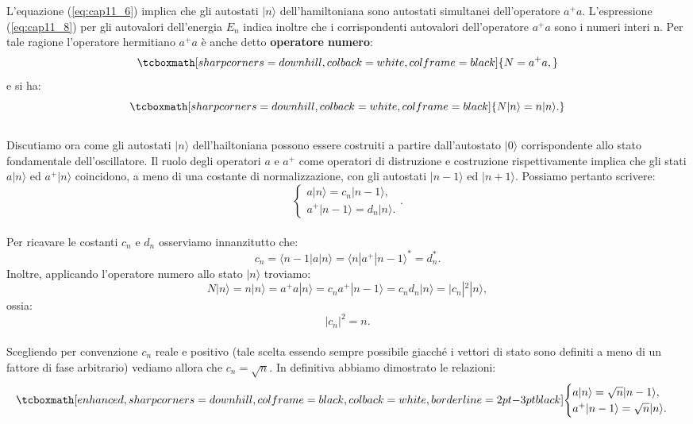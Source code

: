 \documentclass[a4paper,12pt,oneside]{book}
\begin{document}
 L'equazione (\ref{eq:cap11_6}) implica che gli autostati $|n\rangle$ dell'hamiltoniana sono autostati simultanei dell'operatore $a^+a$. L'espressione (\ref{eq:cap11_8}) per gli autovalori dell'energia $E_n$ indica inoltre che i corrispondenti autovalori dell'operatore $a^+a$ sono i numeri interi n. Per tale ragione l'operatore hermitiano $a^+a$ è anche detto \textbf{operatore numero}:
	\begin{equation}
		\tcboxmath[sharp corners=downhill, colback=white, colframe=black]{
			N=a^+a,
			}
	\end{equation}
e si ha:
	\begin{equation}
		\tcboxmath[sharp corners=downhill, colback=white, colframe=black]{
			N|n\rangle=n|n\rangle .
			}
	\end{equation}\\
	
 Discutiamo ora come gli autostati $|n\rangle$ dell'hailtoniana possono essere costruiti a partire dall'autostato $|0\rangle$ corrispondente allo stato fondamentale dell'oscillatore.  Il ruolo degli operatori $a$ e $a^+$ come operatori di distruzione e costruzione rispettivamente implica che gli stati $a|n\rangle$ ed $a^+|n\rangle$ coincidono, a meno di una costante di normalizzazione, con gli autostati $|n-1\rangle$ ed $|n+1\rangle$. Possiamo pertanto scrivere:
	\begin{equation}
		\begin{cases}
			a|n\rangle=c_n|n-1\rangle,\\
			a^+|n-1\rangle=d_n|n\rangle.
		\end{cases}.
	\end{equation}\\

 Per ricavare le costanti $c_n$ e $d_n$ osserviamo innanzitutto che:
	\begin{equation}
		c_n=\langle n-1|a|n\rangle=\langle n|a^+|n-1\rangle^*=d_n^*.
	\end{equation}
 Inoltre, applicando l'operatore numero allo stato $|n\rangle$ troviamo:
	\begin{equation}
		N|n\rangle=n|n\rangle=a^+a|n\rangle=c_na^+|n-1\rangle=c_nd_n|n\rangle=|c_n|^2|n\rangle,
	\end{equation}
ossia:
	\begin{equation}
		|c_n|^2=n.
	\end{equation}\\
	
Scegliendo per convenzione $c_n$ reale e positivo (tale scelta essendo sempre possibile giacché i vettori di stato sono definiti a meno di un fattore di fase arbitrario) vediamo allora che $c_n=\sqrt{n}$. In definitiva abbiamo dimostrato le relazioni:
	\begin{equation}
	\label{eq:cap11_9}
		\tcboxmath[enhanced, sharp corners=downhill, colframe=black, colback=white, borderline={2pt}{-3pt}{black}]{
		\begin{cases}
			a|n\rangle= \sqrt{n} |n-1\rangle, \\
			a^+|n-1\rangle=\sqrt{n}|n\rangle.
			\end{cases}
			}
	\end{equation}\\
	
\end{document}

